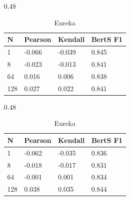 \begin{table}[h!]
    \centering
    \scriptsize
\begin{subtable}[t]{0.48\textwidth}
\centering
\begin{tabular}{l|lll}
\textbf{N} & \textbf{Pearson} & \textbf{Kendall} & \textbf{BertS F1} \\ \hline
1 & -0.066 & -0.039 & 0.845 \\
8 & -0.023 & -0.013 & 0.841 \\
64 & 0.016 & 0.006 & 0.838 \\
128 & 0.027 & 0.022 & 0.841 \\
\end{tabular}
\caption{Elife}
\label{tab:icl-mini-elife}
\end{subtable}
\hfill
\begin{subtable}[t]{0.48\textwidth}
\centering
\begin{tabular}{l|lll}
\textbf{N} & \textbf{Pearson} & \textbf{Kendall} & \textbf{BertS F1} \\ \hline
1 & -0.062 & -0.035 & 0.836 \\
8 & -0.018 & -0.017 & 0.831 \\
64 & -0.001 & 0.001 & 0.834 \\
128 & 0.038 & 0.035 & 0.844 \\
\end{tabular}
\caption{Eureka}
\label{tab:icl-mini-eureka}
\end{subtable}

\vspace{1em}


\end{table}
